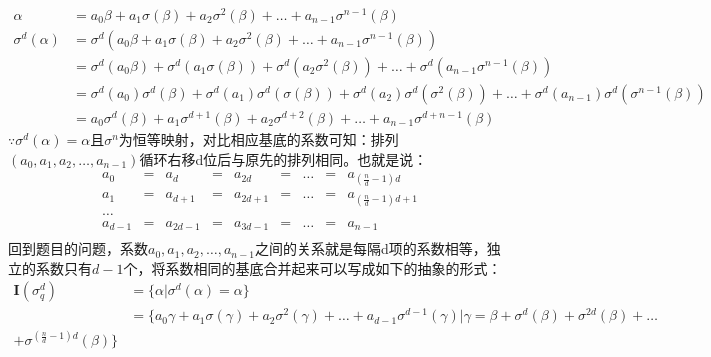 \begin{solution}\ \\
    \begin{equation*}
        \begin{aligned}
            \alpha&=a_0\beta+a_1\sigma(\beta)+a_2\sigma^2(\beta)+\dots+a_{n-1}\sigma^{n-1}(\beta)\\
            \sigma^d(\alpha)&=\sigma^d(a_0\beta+a_1\sigma(\beta)+a_2\sigma^2(\beta)+\dots+a_{n-1}\sigma^{n-1}(\beta))\\
            &=\sigma^d(a_0\beta)+\sigma^d(a_1\sigma(\beta))+\sigma^d(a_2\sigma^2(\beta))+\dots+\sigma^d(a_{n-1}\sigma^{n-1}(\beta))\\
            &=\sigma^d(a_0)\sigma^d(\beta)+\sigma^d(a_1)\sigma^d(\sigma(\beta))+\sigma^d(a_2)\sigma^d(\sigma^2(\beta))+\dots+\sigma^d(a_{n-1})\sigma^d(\sigma^{n-1}(\beta))\\
            &=a_0\sigma^d(\beta)+a_1\sigma^{d+1}(\beta)+a_2\sigma^{d+2}(\beta)+\dots+a_{n-1}\sigma^{d+n-1}(\beta)
        \end{aligned}
    \end{equation*}
    $\because\sigma^d(\alpha)=\alpha$且$\sigma^n$为恒等映射，对比相应基底的系数可知：排列$(a_0,a_1,a_2,\dots,a_{n-1})$循环右移d位后与原先的排列相同。也就是说：
    \begin{equation*}
        \begin{aligned}
            a_0&=&a_d&=&a_{2d}&=&\dots&=&a_{(\frac{n}{d}-1)d}\\
            a_1&=&a_{d+1}&=&a_{2d+1}&=&\dots&=&a_{(\frac{n}{d}-1)d+1}\\
            \ldots\\
            a_{d-1}&=&a_{2d-1}&=&a_{3d-1}&=&\dots&=&a_{n-1}\\
        \end{aligned}
    \end{equation*}
    回到题目的问题，系数$a_0,a_1,a_2,\dots,a_{n-1}$之间的关系就是每隔d项的系数相等，独立的系数只有$d-1$个，将系数相同的基底合并起来可以写成如下的抽象的形式：
    \begin{equation*}
        \begin{aligned}
            \textbf{I}(\sigma_q^d)&=\{\alpha|\sigma^d(\alpha)=\alpha\}\\
            &=\{a_0\gamma+a_1\sigma(\gamma)+a_2\sigma^2(\gamma)+\dots+a_{d-1}\sigma^{d-1}(\gamma)|\gamma=\beta+\sigma^d(\beta)+\sigma^{2d}(\beta)+\dots\\+\sigma^{(\frac{n}{d}-1)d}(\beta)\}
        \end{aligned}

\end{equation*}
\end{solution}
